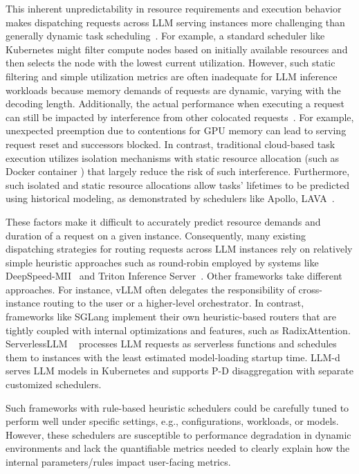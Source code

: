 \documentclass[sigconf, review, anonymous]{acmart}
\begin{document}
This inherent unpredictability in resource requirements and execution behavior makes dispatching requests across LLM serving instances more challenging than generally dynamic task scheduling~\cite{dynamic_task_scheduling}. For example, a standard scheduler like Kubernetes might filter compute nodes based on initially available resources and then selects the node with the lowest current utilization. However, such static filtering and simple utilization metrics are often inadequate for LLM inference workloads because memory demands of requests are dynamic, varying with the decoding length. Additionally, the actual performance when executing a request can still be impacted by interference from other colocated requests~\cite{sun2024llumnix}. For example, unexpected preemption due to contentions for GPU memory can lead to serving request reset and successors blocked. In contrast, traditional cloud-based task execution utilizes isolation mechanisms with static resource allocation (such as Docker container \cite{docker}) that largely reduce the risk of such interference. Furthermore, such isolated and static resource allocations allow tasks' lifetimes to be predicted using historical modeling, as demonstrated by schedulers like Apollo\cite{Apollo},  LAVA~\cite{ling2025lavalifetimeawarevmallocation}.

These factors make it difficult to accurately predict resource demands and duration of a request on a given instance. Consequently, many existing dispatching strategies for routing requests across LLM instances rely on relatively simple heuristic approaches such as round-robin employed by systems like DeepSpeed-MII~\cite{deepspeed} and Triton Inference Server~\cite{nvidiaTritonInference}. Other frameworks take different approaches. For instance, vLLM often delegates the responsibility of cross-instance routing to the user or a higher-level orchestrator. In contrast, frameworks like SGLang implement their own heuristic-based routers that are tightly coupled with internal optimizations and features, such as RadixAttention. ServerlessLLM ~\cite{serverlessLLM} processes LLM requests as serverless functions and schedules them to instances with the least estimated model-loading startup time. LLM-d ~\cite{githubGitHubLlmdllmd} serves LLM models in Kubernetes and supports P-D disaggregation with separate customized schedulers. 

Such frameworks with rule-based heuristic schedulers could be carefully tuned to perform well under specific settings, e.g., configurations, workloads, or models. However, these schedulers are susceptible to performance degradation in dynamic environments and lack the quantifiable metrics needed to clearly explain how the internal parameters/rules impact user-facing metrics.
\end{document}
